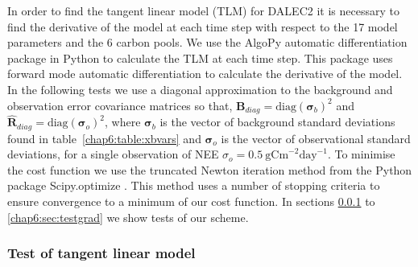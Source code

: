 In order to find the tangent linear model (TLM) for DALEC2 it is necessary to find the derivative of the model at each time step with respect to the 17 model parameters and the 6 carbon pools. We use the AlgoPy automatic differentiation package \citep{Walter2013} in Python to calculate the TLM at each time step. This package uses forward mode automatic differentiation to calculate the derivative of the model. In the following tests we use a diagonal approximation to the background and observation error covariance matrices so that, 
$\textbf{B}_{diag}=\text{diag}(\bm{\sigma}_b)^2$ and $\hat{\textbf{R}}_{diag}=\text{diag}(\bm{\sigma}_o )^2$,
where $\bm{\sigma}_b$ is the vector of background standard deviations found in table~\ref{chap6:table:xbvars} and $\bm{\sigma}_o$ is the vector of observational standard deviations, for a single observation of NEE $\sigma_o=0.5~\text{gCm}^{-2}\text{day}^{-1}$. To minimise the cost function we use the truncated Newton iteration method \citep{Nocedal1999} from the Python package Scipy.optimize \citep{scipy2015}. This method uses a number of stopping criteria to ensure convergence to a minimum of our cost function. In sections \ref{chap6:sec:testtlm} to \ref{chap6:sec:testgrad} we show tests of our scheme. 


\subsubsection{Test of tangent linear model} \label{chap6:sec:testtlm}

